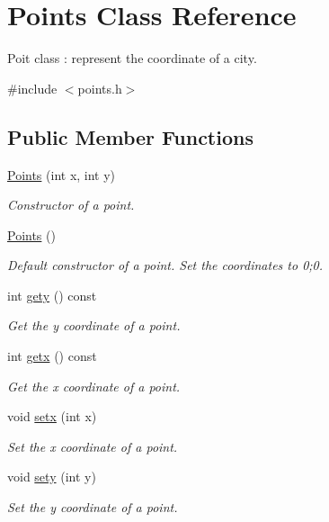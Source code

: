 \hypertarget{class_points}{}\section{Points Class Reference}
\label{class_points}


Poit class \+: represent the coordinate of a city.  




{\ttfamily \#include $<$points.\+h$>$}

\subsection*{Public Member Functions}
\begin{DoxyCompactItemize}
\item 
\hyperlink{class_points_a8465a6ce33ac38614004d8554a63cb25}{Points} (int x, int y)
\begin{DoxyCompactList}\small\item\em Constructor of a point. \end{DoxyCompactList}\item 
\hyperlink{class_points_aa4e68083d98bd04233c9753dfe1e46ab}{Points} ()
\begin{DoxyCompactList}\small\item\em Default constructor of a point. Set the coordinates to 0;0. \end{DoxyCompactList}\item 
int \hyperlink{class_points_aaaa2207f4ca3a034e4992b11096e5b30}{gety} () const
\begin{DoxyCompactList}\small\item\em Get the y coordinate of a point. \end{DoxyCompactList}\item 
int \hyperlink{class_points_a3228a003ef8408c5d51159889c14a210}{getx} () const
\begin{DoxyCompactList}\small\item\em Get the x coordinate of a point. \end{DoxyCompactList}\item 
void \hyperlink{class_points_a47c7b83df0178f8f9315f76d629335cb}{setx} (int x)
\begin{DoxyCompactList}\small\item\em Set the x coordinate of a point. \end{DoxyCompactList}\item 
void \hyperlink{class_points_a54f8ad58213ae7284f091f2a117236f3}{sety} (int y)
\begin{DoxyCompactList}\small\item\em Set the y coordinate of a point. \end{DoxyCompactList}\end{DoxyCompactItemize}


